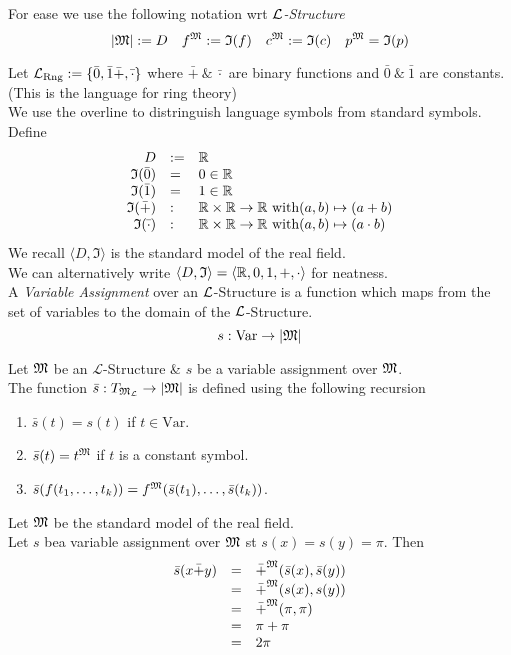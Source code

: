 \documentclass[11pt,a4paper]{article}
\begin{document}
For ease we use the following notation wrt \textit{$\mathcal{L}$-Structure}
$$|\mathfrak{M}|:=D\quad f^{\mathfrak{M}}:=\mathfrak{I}(f)\quad c^{\mathfrak{M}}:=\mathfrak{I}(c)\quad p^{\mathfrak{M}}=\mathfrak{I}(p)$$

Let $\mathcal{L}_\text{Rng}:=\{\bar0,\bar1\bar+,\bar\cdot\}$ where $\bar+\ \&\ \bar\cdot$ are binary functions and $\bar0\ \&\ \bar1$ are constants.\\
(This is the language for ring theory)\\
We use the overline to distringuish language symbols from standard symbols.\\
Define
\[\begin{array}{rll}
D&:=&\mathbb{R}\\
\mathfrak{I}(\bar0)&=&0\in\mathbb{R}\\
\mathfrak{I}(\bar1)&=&1\in\mathbb{R}\\
\mathfrak{I}(\bar+)&:&\mathbb{R}\times\mathbb{R}\to\mathbb{R}\text{ with} (a,b)\mapsto(a+b)\\
\mathfrak{I}(\bar\cdot)&:&\mathbb{R}\times\mathbb{R}\to\mathbb{R}\text{ with} (a,b)\mapsto(a\cdot b)
\end{array}\]
We recall $\langle D,\mathfrak{I}\rangle$ is the standard model of the real field.\\
\nb We can alternatively write $\langle D,\mathfrak{I}\rangle=\langle\mathbb{R},0,1,+,\cdot\rangle$ for neatness.\\

A \textit{Variable Assignment} over an $\mathcal{L}$-Structure is a function which maps from the set of variables to the domain of the $\mathcal{L}$-Structure.
$$s:\text{Var}\to|\mathfrak{M}|$$

Let $\mathfrak{M}$ be an $\mathcal{L}$-Structure \& $s$ be a variable assignment over $\mathfrak{M}$.\\
The function $\bar{s}:T_{\mathfrak{M}_\mathcal{L}}\to|\mathfrak{M}|$ is defined using the following recursion
\begin{enumerate}
	\item $\bar{s}(t)=s(t)$ if $t\in\text{Var}$.
	\item $\bar{s}(t)=t^{\mathfrak{M}}$ if $t$ is a constant symbol.
	\item $\bar{s}(f(t_1,\dots,t_k))=f^{\mathfrak{M}}(\bar{s}(t_1),\dots,\bar{s}(t_k))$.
\end{enumerate}

Let $\mathfrak{M}$ be the standard model of the real field.\\
Let $s$ bea variable assignment over $\mathfrak{M}$ st $s(x)=s(y)=\pi$. Then
\[\begin{array}{rcl}
\bar{s}(x\bar+y)&=&\bar+^{\mathfrak{M}}(\bar{s}(x),\bar{s}(y))\\
&=&\bar+^{\mathfrak{M}}(s(x),s(y))\\
&=&\bar+^{\mathfrak{M}}(\pi,\pi)\\
&=&\pi+\pi\\
&=&2\pi
\end{array}\]
\end{document}
